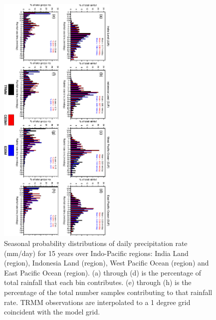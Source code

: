 \documentclass[draft,ms]{AGUTeX}
\begin{document}
\begin{article}
\begin{figure}[t]
  \begin{center}
    \noindent\includegraphics[width=0.5\textwidth,angle=90.]{./figs/f_pdf_PRECT.pdf}
  \end{center}
  \caption{Seasonal probability distributions of daily precipitation rate (mm/day) for 15 years over Indo-Pacific regions: India Land (region), Indonesia Land (region), West Pacific Ocean (region) and East Pacific Ocean (region). (a) through (d) is the percentage of total rainfall that each bin contributes. (e) through (h) is the percentage of the total number samples contributing to that rainfall rate. TRMM observations are interpolated to a 1 degree grid coincident with the model grid.} 
\label{f_pdf_PRECT}
\end{figure}


\end{article}
\end{document}
